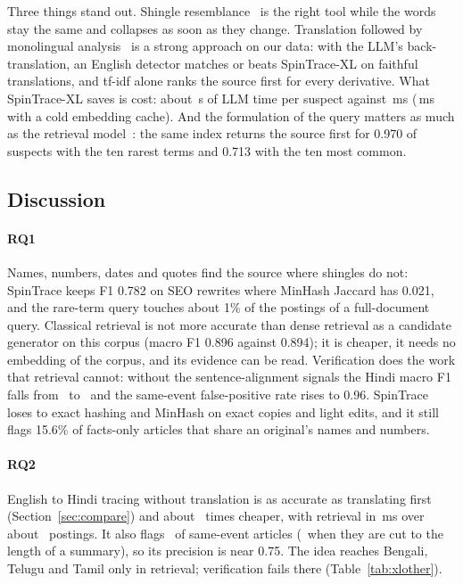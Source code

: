 \documentclass[11pt,a4paper]{article}
\begin{document}
Three things stand out. Shingle resemblance~\cite{broder1997} is the right tool while the words stay the same and collapses as soon as they change. Translation followed by monolingual analysis~\cite{potthast2011} is a strong approach on our data: with the LLM's back-translation, an English detector matches or beats SpinTrace-XL on faithful translations, and tf-idf alone ranks the source first for every derivative. What SpinTrace-XL saves is cost: about \nBtLlmSec\,s of LLM time per suspect against \nXlMs\,ms (\nXlColdMs\,ms with a cold embedding cache). And the formulation of the query matters as much as the retrieval model~\cite{hagen2015}: the same index returns the source first for 0.970 of suspects with the ten rarest terms and 0.713 with the ten most common.

\subsection{Discussion}

\paragraph{RQ1} Names, numbers, dates and quotes find the source where shingles do not: SpinTrace keeps F1 0.782 on SEO rewrites where MinHash Jaccard has 0.021, and the rare-term query touches about 1\% of the postings of a full-document query. Classical retrieval is not more accurate than dense retrieval as a candidate generator on this corpus (macro F1 0.896 against 0.894); it is cheaper, it needs no embedding of the corpus, and its evidence can be read. Verification does the work that retrieval cannot: without the sentence-alignment signals the Hindi macro F1 falls from \nAblFull\ to \nAblNoAlign\ and the same-event false-positive rate rises to 0.96. SpinTrace loses to exact hashing and MinHash on exact copies and light edits, and it still flags 15.6\% of facts-only articles that share an original's names and numbers.

\paragraph{RQ2} English to Hindi tracing without translation is as accurate as translating first (Section~\ref{sec:compare}) and about \nSpeedup\ times cheaper, with retrieval in \nXlRetMs\,ms over about \nXlPostings\ postings. It also flags \nXlFprSame\ of same-event articles (\nXlFprShort\ when they are cut to the length of a summary), so its precision is near 0.75. The idea reaches Bengali, Telugu and Tamil only in retrieval; verification fails there (Table~\ref{tab:xlother}).
\end{document}
